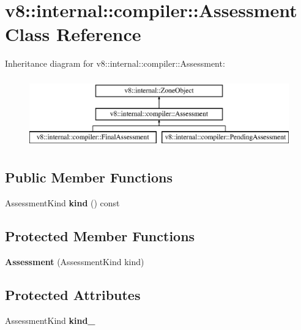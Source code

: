 \hypertarget{classv8_1_1internal_1_1compiler_1_1_assessment}{}\section{v8\+:\+:internal\+:\+:compiler\+:\+:Assessment Class Reference}
\label{classv8_1_1internal_1_1compiler_1_1_assessment}
Inheritance diagram for v8\+:\+:internal\+:\+:compiler\+:\+:Assessment\+:\begin{figure}[H]
\begin{center}
\leavevmode
\includegraphics[height=3.000000cm]{classv8_1_1internal_1_1compiler_1_1_assessment}
\end{center}
\end{figure}
\subsection*{Public Member Functions}
\begin{DoxyCompactItemize}
\item 
Assessment\+Kind {\bfseries kind} () const \hypertarget{classv8_1_1internal_1_1compiler_1_1_assessment_ab022f2817e13dec4bb8318c2ec1874de}{}\label{classv8_1_1internal_1_1compiler_1_1_assessment_ab022f2817e13dec4bb8318c2ec1874de}

\end{DoxyCompactItemize}
\subsection*{Protected Member Functions}
\begin{DoxyCompactItemize}
\item 
{\bfseries Assessment} (Assessment\+Kind kind)\hypertarget{classv8_1_1internal_1_1compiler_1_1_assessment_a8bedfc7bec0f2f77dfcab9bd98d232bf}{}\label{classv8_1_1internal_1_1compiler_1_1_assessment_a8bedfc7bec0f2f77dfcab9bd98d232bf}

\end{DoxyCompactItemize}
\subsection*{Protected Attributes}
\begin{DoxyCompactItemize}
\item 
Assessment\+Kind {\bfseries kind\+\_\+}\hypertarget{classv8_1_1internal_1_1compiler_1_1_assessment_a59a845038607ebb84ef021b985e67920}{}\label{classv8_1_1internal_1_1compiler_1_1_assessment_a59a845038607ebb84ef021b985e67920}

\end{DoxyCompactItemize}
